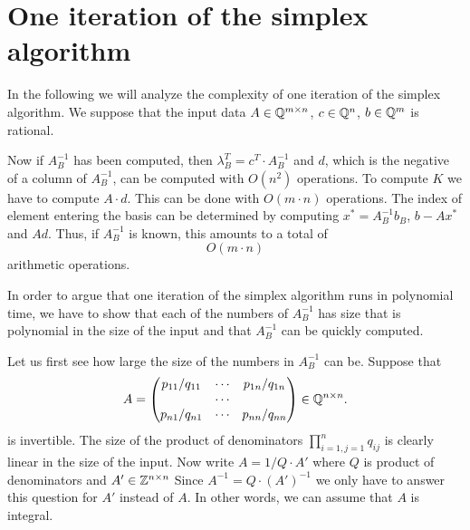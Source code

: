 
\section{One iteration of the simplex algorithm}
\label{sec:one-iter-simpl}


In the following we will analyze the complexity of one iteration of the simplex algorithm.  We suppose that the 
input data  $A \in \mathbb{Q}^{m\times n}$, $c \in \mathbb{Q}^n$, $b \in \mathbb{Q}^{m}$ is rational. 

Now if $A_B^{-1}$ has been computed, then $\lambda_B^T = c^T \cdot
A_B^{-1} $ and $d$, which is the negative of a column of $A_B^{-1}$,
can be computed with $O(n^2)$ operations.  To compute $K$ we have to
compute $A\cdot d$. This can be done with $O(m\cdot n)$
operations. The index of element entering the basis can be determined
by computing $x^* = A_B^{-1} b_B$, $b - Ax^*$ and $Ad$.  Thus, if
$A_B^{-1}$ is known, this amounts to a total of
  \begin{displaymath}
    O(m \cdot n) 
  \end{displaymath}
  arithmetic operations.
  

In order to argue that one iteration of the simplex algorithm runs in polynomial time, we have to show that  each of the numbers of  $A_B^{-1}$ has size that is polynomial in the size of the input and that 
$A_B^{-1}$ can be quickly computed. 


Let us first see how large the size of the numbers in $A_B^{-1}$ can be. 
Suppose that 
\begin{displaymath} 
  A =
  \begin{pmatrix}
    p_{11}/q_{11} & \cdots & p_{1n}/q_{1n} \\
             & \cdots &  \\
   p_{n1}/q_{n1} & \cdots & p_{nn}/q_{nn} \\
  \end{pmatrix} \in \mathbb{Q}^{n\times n}.  
\end{displaymath}
is invertible. 
The {size}  of the product of denominators $\prod_{i=1,j=1}^n q_{ij}$
is  
clearly  linear in the size of the input. 
Now write $A = 1/Q \cdot A'$ where $Q$ is product of denominators and $A'\in
  \mathbb{Z}^{n\times n}$  
 Since $A^{-1} = Q\cdot (A')^{-1} $ we only have to answer  this question for $A'$ instead of $A$. In other words, we can  assume that $A$ is integral. 



